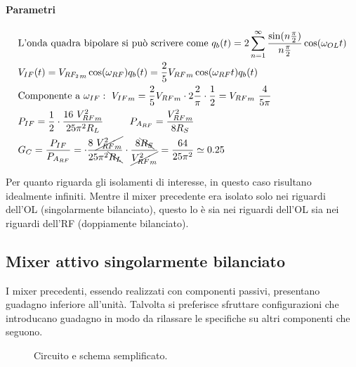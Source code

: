 \paragraph{Parametri}

\begin{align*}
&\mbox{L'onda quadra bipolare si può scrivere come }
q_b(t) = 2\sum_{n=1}^{\infty} \frac{\sin(n\frac{\pi}{2})}{n\frac{\pi}{2}} \cos(\omega_{OL} t)
\\
&V_{IF}(t) = {V_{RF_2}}_m \cos(\omega_{RF} ) q_b(t) = \frac{2}{5} {V_{RF}}_m \cos(\omega_{RF} t)  q_b(t)
\\
&\mbox{Componente a }\omega_{IF}:~ {V_{IF}}_m =
\frac{2}{5} {V_{RF}}_m \cdot 2 \frac{2}{\pi} \cdot \frac{1}{2} = {V_{RF}}_m~\frac{4}{5\pi}
\\
&P_{IF} = \frac{1}{2} \cdot \frac{16~{V^2_{RF}}_m}{25\pi^2 R_L} ~~~~~~~~ {P_{A_{RF}}} = \frac{{V^2_{RF}}_m}{8 R_S}
\\
& G_C = \frac{P_{IF}}{{P_{A_{RF}}}} =
\cdot \frac{8 ~\cancel{{V^2_{RF}}_m}}{25 \pi^2 \bcancel{R_L}} \cdot
\frac{8 \bcancel{R_S}}{\cancel{{V^2_{RF}}_m}} = \frac{64}{25\pi^2} \simeq 0.25
\end{align*}

Per quanto riguarda gli isolamenti di interesse, in questo caso risultano idealmente infiniti.
Mentre il mixer precedente era isolato solo nei riguardi dell'OL (singolarmente bilanciato),
questo lo è sia nei riguardi dell'OL sia nei riguardi dell'RF (doppiamente bilanciato).

\subsection{Mixer attivo singolarmente bilanciato}
I mixer precedenti, essendo realizzati con componenti passivi, presentano guadagno inferiore all'unità. Talvolta si preferisce sfruttare configurazioni che introducano guadagno in modo da rilassare le specifiche su altri componenti che seguono.


\begin{figure}[h]
	\hspace{\fill}
	\hspace{\fill}
	\hspace{\fill}
	\caption{Circuito e schema semplificato.}
	\label{fig:mixer-attivo-sb}
\end{figure}

